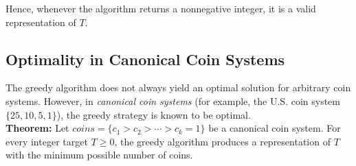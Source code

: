 \documentclass[12pt,a4paper]{report}
\begin{document}
Hence, whenever the algorithm returns a nonnegative integer, it is a valid representation of $T$.

\subsection{Optimality in Canonical Coin Systems}
The greedy algorithm does not always yield an optimal solution for arbitrary coin systems.  
However, in \emph{canonical coin systems} (for example, the U.S. coin system $\{25,10,5,1\}$), the greedy strategy is known to be optimal. \\

\textbf{Theorem:}
Let $coins=\{c_1>c_2>\cdots>c_k=1\}$ be a canonical coin system. For every integer target $T\ge0$, the greedy algorithm produces a representation of $T$ with the minimum possible number of coins.
\end{document}
